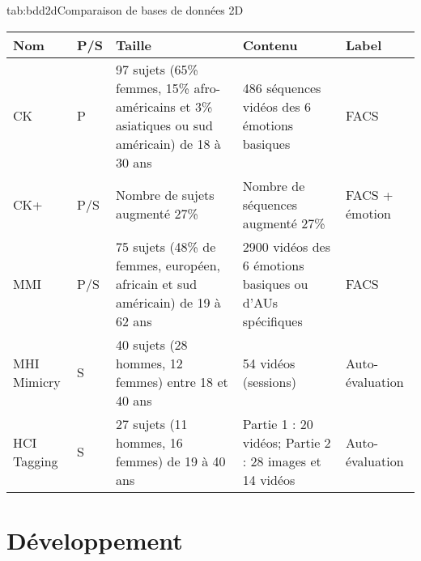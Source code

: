 \documentclass[overfullbox, poster]{polytech/polytech}
\begin{document}
\begin{Table}{tab:bdd2d}{Comparaison de bases de données 2D}
	\begin{tabular}{|p{2cm}|p{0.7cm}|p{5cm}|p{4cm}|p{2cm}|}
		\hline
		\textbf{Nom} &\textbf{P/S} &\textbf{Taille} &\textbf{Contenu} &\textbf{Label}\\\hline
		CK\cite{ck} &P & 97 sujets (65\% femmes, 15\% afro-américains et 3\% asiatiques ou sud américain) de 18 à 30 ans &486 séquences vidéos des 6 émotions basiques & FACS\\
		CK+\cite{ckplus} &P/S &Nombre de sujets augmenté 27\% &Nombre de séquences augmenté 27\% &FACS + émotion\\
		MMI\cite{mmi1} \cite{mmi2} &P/S &75 sujets (48\% de femmes, européen, africain et sud américain) de 19 à 62 ans &2900 vidéos des 6 émotions basiques ou d'AUs spécifiques &FACS\\
		MHI Mimicry\cite{mimicry1}\cite{mimicry2} &S & 40 sujets (28 hommes, 12 femmes) entre 18 et 40 ans &54 vidéos (sessions) &Auto-évaluation\\
		HCI Tagging\cite{tagging1}\cite{tagging2} &S &27 sujets (11 hommes, 16 femmes) de 19 à 40 ans &Partie 1 : 20 vidéos; Partie 2 : 28 images et 14 vidéos &Auto-évaluation\\\hline
	\end{tabular}
\end{Table}


\part{Développement}
\label{part:part_dev}


\end{document}
